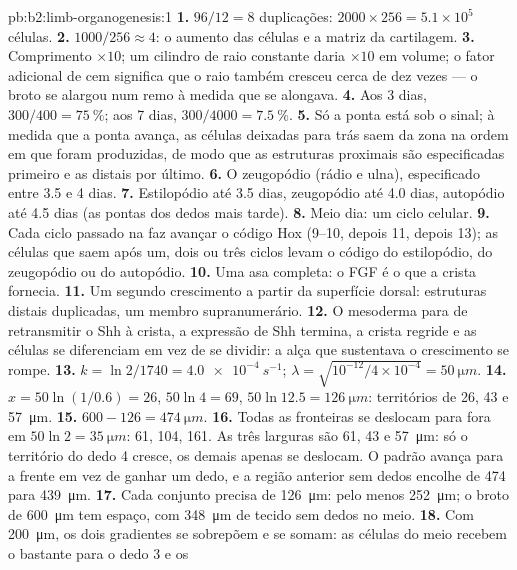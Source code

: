 \begin{solution}{pb:b2:limb-organogenesis:1}
\textbf{1.} $96/12 = 8$ duplicações: $2000\times 256 = 5.1\times 10^{5}$
células.
\textbf{2.} $1000/256 \approx 4$: o aumento das células e a matriz da
cartilagem.
\textbf{3.} Comprimento $\times 10$; um cilindro de raio constante
daria $\times 10$ em volume; o fator adicional de cem significa que o
raio também cresceu cerca de dez vezes --- o broto se alargou num remo à
medida que se alongava.
\textbf{4.} Aos 3 dias, $300/400 = \qty{75}{\%}$; aos 7 dias,
$300/4000 =
\qty{7.5}{\%}$.
\textbf{5.} Só a ponta está sob o sinal; à medida que a ponta avança,
as células deixadas para trás saem da zona na ordem em que foram
produzidas, de modo que as estruturas proximais são especificadas
primeiro e as distais por último.
\textbf{6.} O zeugopódio (rádio e ulna), especificado entre 3.5 e 4
dias.
\textbf{7.} Estilopódio até 3.5 dias, zeugopódio até 4.0 dias,
autopódio até 4.5 dias (as pontas dos dedos mais tarde).
\textbf{8.} Meio dia: um ciclo celular.
\textbf{9.} Cada ciclo passado na  faz avançar o
código Hox (9--10, depois 11, depois 13); as células que saem após um,
dois ou três ciclos levam o código do estilopódio, do zeugopódio ou do
autopódio.
\textbf{10.} Uma asa completa: o FGF é o que a crista fornecia.
\textbf{11.} Um segundo crescimento a partir da superfície dorsal:
estruturas distais duplicadas, um membro supranumerário.
\textbf{12.} O mesoderma para de retransmitir o Shh à crista, a
expressão de Shh termina, a crista regride e as células se diferenciam
em vez de se dividir: a alça que sustentava o crescimento se rompe.
\textbf{13.} $k = \ln 2/1740 = \qty{4.0e-4}{s^{-1}}$; $\lambda =
\sqrt{10^{-12}/4\times 10^{-4}} = \qty{50}{\micro m}$.
\textbf{14.} $x = 50\ln(1/0.6) = 26$, $50\ln 4 = 69$, $50\ln 12.5 =
\qty{126}{\micro m}$: territórios de 26, 43 e \qty{57}{\micro m}.
\textbf{15.} $600 - 126 = \qty{474}{\micro m}$.
\textbf{16.} Todas as fronteiras se deslocam para fora em
$50\ln 2 = \qty{35}{\micro
m}$: 61, 104, 161. As três larguras são 61, 43 e \qty{57}{\micro m}:
só o território do dedo 4 cresce, os demais apenas se deslocam. O padrão
avança para a frente em vez de ganhar um dedo, e a região anterior sem
dedos encolhe de 474 para \qty{439}{\micro m}.
\textbf{17.} Cada conjunto precisa de \qty{126}{\micro m}: pelo menos
\qty{252}{\micro m}; o broto de \qty{600}{\micro m} tem espaço, com
\qty{348}{\micro m} de tecido sem dedos no meio.
\textbf{18.} Com \qty{200}{\micro m}, os dois gradientes se sobrepõem e
se somam: as células do meio recebem o bastante para o dedo 3 e os

\end{solution}
